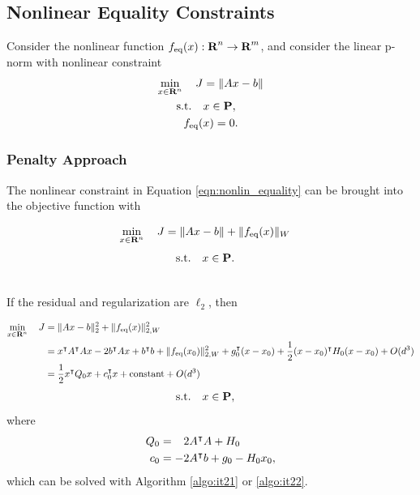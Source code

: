 \documentclass{article}
\begin{document}
\subsection{Nonlinear Equality Constraints}\label{sec:np_constraint}

    Consider the nonlinear function $f_{\text{eq}}(x):\textbf{R}^n\to\textbf{R}^m$,
    and consider the linear p-norm with nonlinear constraint
    \begin{align}
        \min_{x\in\textbf{R}^n} \quad J &= \|Ax-b\|\nonumber\\
        \text{s.t.} \quad &x\in\textbf{P},\nonumber\\
        f_{\text{eq}}(&x)=0.\label{eqn:nonlin_equality}
    \end{align}

\subsubsection{Penalty Approach}

    The nonlinear constraint in Equation \ref{eqn:nonlin_equality} can be brought into the objective function with
    
    \begin{align*}
        \min_{x\in\textbf{R}^n} \quad J &= \|Ax-b\|+\|f_{\text{eq}}(x)\|_W
    \end{align*}
    \begin{align*}
        \text{s.t.} \quad &x\in\textbf{P}.
    \end{align*}

    \\
    If the residual and regularization are $\ell_2$, then

    \begin{align*}
        \min_{x\in\textbf{R}^n} \quad J &= \|Ax-b\|_2^2+\|f_{\text{eq}}(x)\|_{2,W}^2\\
        &=x^\intercal A^\intercal A x -2 b^\intercal Ax +b^\intercal b+\|f_{\text{eq}}(x_0)\|_{2,W}^2 + g_0^\intercal(x-x_0)+\frac{1}{2} (x-x_0)^\intercal H_0 (x-x_0)+ O(d^3)\\
        & = \frac{1}{2} x^\intercal Q_0 x +c_0^\intercal x +\text{constant} + O(d^3)
    \end{align*}
    \begin{align*}
        \text{s.t.} \quad x&\in\textbf{P},
    \end{align*}
    where
    \begin{align*}
        Q_0&=\minus2A^\tp A + H_0\\
        c_0&=-2A^\tp b+g_0-H_0x_0,
    \end{align*}
    which can be solved with Algorithm \ref{algo:it21} or \ref{algo:it22}.
\end{document}
